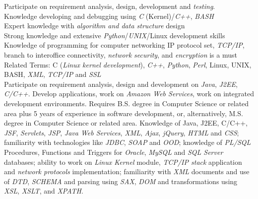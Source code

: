 \begin{framed}\noindent
Participate on requirement analysis, design, development and \emph{testing}.\\
Knowledge developing and debugging using \emph{C} (Kernel)/\emph{C++}, \emph{BASH} \\
Expert knowledge with \emph{algorithm and data structure} design \\
Strong knowledge and extensive \emph{Python}/\emph{UNIX}/Linux development skills \\
Knowledge of programming for computer networking IP protocol set, \emph{TCP/IP}, branch to interoffice connectivity, \emph{network security}, and \emph{encryption} is a must \\
Related Terms: C (\emph{Linux kernel development}), \emph{C++}, \emph{Python}, \emph{Perl}, Linux, UNIX, BASH, \emph{XML}, \emph{TCP/IP} and \emph{SSL}\\
Participate on requirement analysis, design and development on \emph{Java}, \emph{J2EE}, \emph{C/C++}. Develop applications, work on \emph{Amazon Web Services}, work on integrated development environments. Requires B.S. degree in Computer Science or related area plus 5 years of experience in software development, or, alternatively, M.S. degree in Computer Science or related area. Knowledge of Java, J2EE, C/C++, \emph{JSF}, \emph{Servlets}, \emph{JSP}, \emph{Java Web Services}, \emph{XML}, \emph{Ajax}, \emph{jQuery}, \emph{HTML} and \emph{CSS}; familiarity with technologies like \emph{JDBC}, \emph{SOAP} and \emph{OOD}; knowledge of \emph{PL/SQL} Procedures, Functions and Triggers for \emph{Oracle}, \emph{MySQL} and \emph{SQL Server} databases; ability to work on \emph{Linux Kernel} module, \emph{TCP/IP stack} application and \emph{network protocols} implementation; familiarity with \emph{XML} documents and use of \emph{DTD}, \emph{SCHEMA} and parsing using \emph{SAX}, \emph{DOM} and transformations using \emph{XSL}, \emph{XSLT}, and \emph{XPATH}.
\end{framed}

